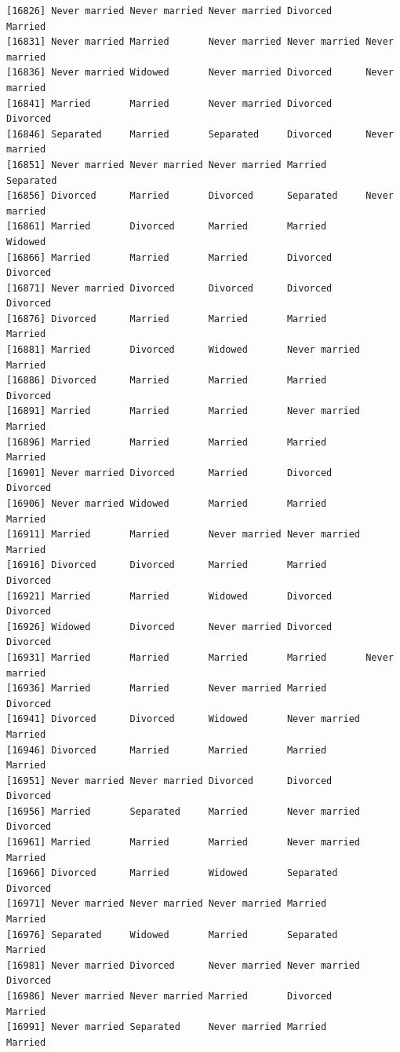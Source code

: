 \documentclass[
  letterpaper,
  DIV=11,
  numbers=noendperiod,
  oneside]{scrartcl}
\begin{document}
\begin{verbatim}
[16826] Never married Never married Never married Divorced      Married      
[16831] Never married Married       Never married Never married Never married
[16836] Never married Widowed       Never married Divorced      Never married
[16841] Married       Married       Never married Divorced      Divorced     
[16846] Separated     Married       Separated     Divorced      Never married
[16851] Never married Never married Never married Married       Separated    
[16856] Divorced      Married       Divorced      Separated     Never married
[16861] Married       Divorced      Married       Married       Widowed      
[16866] Married       Married       Married       Divorced      Divorced     
[16871] Never married Divorced      Divorced      Divorced      Divorced     
[16876] Divorced      Married       Married       Married       Married      
[16881] Married       Divorced      Widowed       Never married Married      
[16886] Divorced      Married       Married       Married       Divorced     
[16891] Married       Married       Married       Never married Married      
[16896] Married       Married       Married       Married       Married      
[16901] Never married Divorced      Married       Divorced      Divorced     
[16906] Never married Widowed       Married       Married       Married      
[16911] Married       Married       Never married Never married Married      
[16916] Divorced      Divorced      Married       Married       Divorced     
[16921] Married       Married       Widowed       Divorced      Divorced     
[16926] Widowed       Divorced      Never married Divorced      Divorced     
[16931] Married       Married       Married       Married       Never married
[16936] Married       Married       Never married Married       Divorced     
[16941] Divorced      Divorced      Widowed       Never married Married      
[16946] Divorced      Married       Married       Married       Married      
[16951] Never married Never married Divorced      Divorced      Divorced     
[16956] Married       Separated     Married       Never married Divorced     
[16961] Married       Married       Married       Never married Married      
[16966] Divorced      Married       Widowed       Separated     Divorced     
[16971] Never married Never married Never married Married       Married      
[16976] Separated     Widowed       Married       Separated     Married      
[16981] Never married Divorced      Never married Never married Divorced     
[16986] Never married Never married Married       Divorced      Married      
[16991] Never married Separated     Never married Married       Married      

\end{verbatim}
\end{document}
